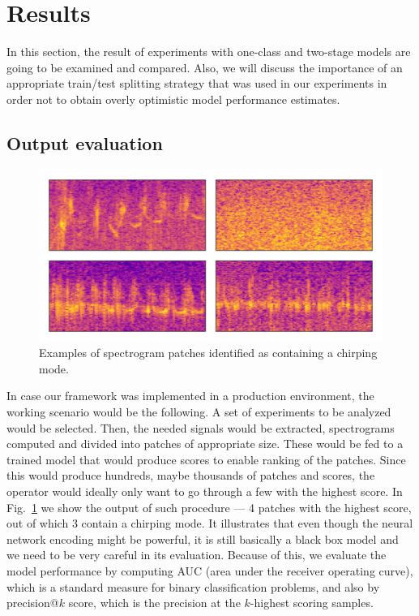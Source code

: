 \section{Results}

In this section, the result of experiments with one-class and two-stage models are going to be examined and compared. Also, we will discuss the importance of an appropriate train/test splitting strategy that was used in our experiments in order not to obtain overly optimistic model performance estimates.

\subsection{Output evaluation}

\begin{figure}
\begin{centering}
\includegraphics[scale=0.5]{data/chapter_alfven/anomalies.png}
\par
\end{centering}
\caption{Examples of spectrogram patches identified as containing a chirping
mode.}
\label{fig:alfven_patches}
\end{figure}

In case our framework was implemented in a production environment, the working scenario would be the following. A set of experiments to be analyzed would be selected. Then, the needed signals would be extracted, spectrograms computed and divided into patches of appropriate size. These would be fed to a trained model that would produce scores to enable ranking of the patches. Since this would produce hundreds, maybe thousands of patches and scores, the operator would ideally only want to go through a few with the highest score. In Fig.~\ref{fig:alfven_patches} we show the output of such procedure --- 4 patches with the highest score, out of which 3 contain a chirping mode. It illustrates that even though the neural network encoding might be powerful, it is still basically a black box model and we need to be very careful in its evaluation. Because of this, we evaluate the model performance by computing AUC (area under the receiver operating curve), which is a standard measure for binary classification problems, and also by precision@$k$ score, which is the precision at the $k$-highest scoring samples. 

